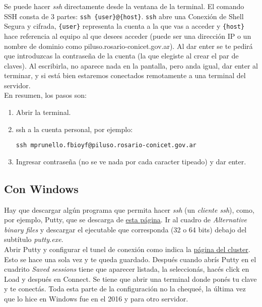 \documentclass[paper=a4, fontsize=11pt]{article} %
\numberwithin{equation}{section} %
\numberwithin{figure}{section} %
\numberwithin{table}{section} %
\begin{document}
Se puede hacer \textit{ssh} directamente desde la ventana de la terminal. El comando SSH consta de 3 partes: \texttt{ssh \{user\}@\{host\}}. \texttt{ssh} abre una Conexión de Shell Segura y cifrada, \texttt{\{user\}} representa la cuenta a la que vas a acceder y \texttt{\{host\}} hace referencia al equipo al que desees acceder (puede ser una dirección IP o un nombre de dominio como piluso.rosario-conicet.gov.ar). Al dar enter se te pedirá que introduzcas la contraseña de la cuenta (la que elegiste al crear el par de claves). Al escribirla, no aparece nada en la pantalla, pero anda igual, dar enter al terminar, y si está bien estaremos conectados remotamente a una terminal del servidor.\\

En resumen, los pasos son:

\begin{enumerate}
	\item Abrir la terminal.
	\item ssh a la cuenta personal, por ejemplo:
	
	\texttt{ssh mprunello.fbioyf@piluso.rosario-conicet.gov.ar}
	
	\item Ingresar contraseña (no se ve nada por cada caracter tipeado) y dar enter.
\end{enumerate}

\subsection{Con Windows}

Hay que descargar algún programa que permita hacer \textit{ssh} (un \textit{cliente ssh}), como, por ejemplo, Putty, que se descarga de \href{https://www.chiark.greenend.org.uk/~sgtatham/putty/latest.html}{esta página}. Ir al cuadro de \textit{Alternative binary files} y descargar el ejecutable que corresponda (32 o 64 bits) debajo del subtítulo \textit{putty.exe}.\\

Abrir Putty y configurar el tunel de conexión como indica la \href{http://cluster.rosario-conicet.gov.ar/cluster_utilizacion.php}{página del cluster}. Esto se hace una sola vez y te queda guardado. Después cuando abrís Putty en el cuadrito \textit{Saved sessions} tiene que aparecer listada, la seleccionás, hacés click en Load y después en Connect. Se tiene que abrir una terminal donde ponés tu clave y te conectás. Toda esta parte de la configuración no la chequeé, la última vez que lo hice en Windows fue en el 2016 y para otro servidor.
\end{document}
